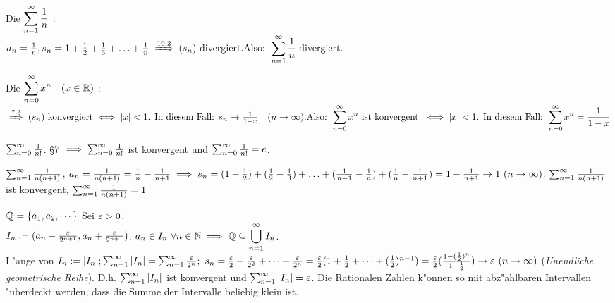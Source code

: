 \documentclass[a4paper,twoside,DIV15,BCOR12mm]{scrbook}
\begin{document}
\begin{beispiele}
\item Die  $\displaystyle{\sum_{n=1}^{\infty}{\frac{1}{n}}}$ :\\
$a_n = \frac{1}{n}, s_n = 1+\frac{1}{2}+\frac{1}{3}+\ldots+\frac{1}{n} \folgtnach{10.2} (s_n) \text{ divergiert.}\\
\text{Also: }\displaystyle\reihe{\frac{1}{n}}\text{ divergiert.}$

\item Die  $\displaystyle{\sum_{n=0}^{\infty}{x^n}}\quad(x\in\mathbb{R})$ :\\
$\folgtnach{7.3} (s_n)\text{ konvergiert} \equizu |x| < 1 \text{. In diesem Fall: } s_n \to \frac{1}{1-x}\quad(n\to\infty).\\
\text{Also: } \displaystyle\reihenull{x^n} \text{ ist konvergent } \equizu |x| < 1 \text{. In diesem Fall: } \displaystyle\reihenull{x^n} = \frac{1}{1-x}$

\item $\sum_{n=0}^{\infty}{\frac{1}{n!}}$. §7 $\implies \sum_{n=0}^{\infty}{\frac{1}{n!}}$ ist konvergent und $\sum_{n=0}^{\infty}{\frac{1}{n!}} = e$.

\item $\sum_{n=1}^{\infty}{\frac{1}{n(n+1)}}$, $a_n=\frac{1}{n(n+1)} = \frac{1}{n} - \frac{1}{n+1} \implies s_n = (1-\frac{1}{2})+(\frac{1}{2} - \frac{1}{3})+\ldots+(\frac{1}{n-1}-\frac{1}{n}) + (\frac{1}n - \frac{1}{n+1}) = 1- \frac{1}{n+1} \to 1 \ (n\to\infty)$. $\sum_{n=1}^{\infty}{\frac{1}{n(n+1)}}$ ist konvergent, $\sum_{n=1}^{\infty}{\frac{1}{n(n+1)}} = 1$
\item $\mathbb{Q}=\{a_1, a_2, \cdots\}$ Sei $\varepsilon>0$.\\ $I_n:=(a_n-\frac{\varepsilon}{2^{n+1}}, a_n+\frac{\varepsilon}{2^{n+1}})$. $a_n \in I_n \ \forall n\in\mathbb{N} \implies \mathbb{Q} \subseteq \displaystyle \bigcup_{n=1}^{\infty}I_n$. \\
L"ange von $I_n:=|I_n|; \reihe{|I_n|}=\reihe{\frac{\ep}{2^n}};\ s_n=\frac{\ep}{2}+\frac{\ep}{2^2}+\cdots+\frac{\ep}{2^n}=\frac{\ep}{2}(1+\frac{1}{2}+\cdots+(\frac{1}{2})^{n-1})=\frac{\ep}{2}(\frac{1-(\frac{1}{2})^n}{1-\frac{1}{2}})\to\ep\ (n\to\infty)$
(\emph{Unendliche geometrische Reihe}). D.h. $\sum_{n=1}^{\infty}{|I_n|}$ ist konvergent und $\sum_{n=1}^{\infty}{|I_n|}=\varepsilon$. Die Rationalen Zahlen k"onnen so mit abz"ahlbaren Intervallen "uberdeckt werden, dass die Summe der Intervalle beliebig klein ist.
\end{beispiele}
\end{document}
